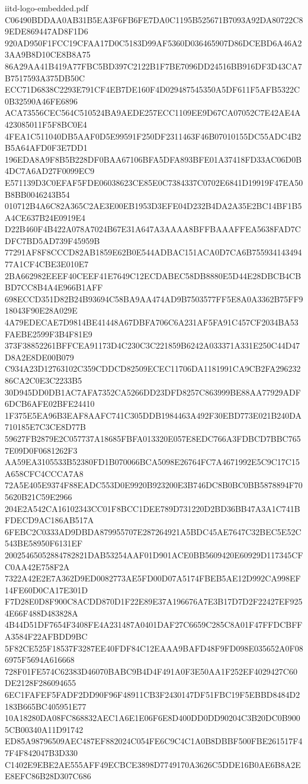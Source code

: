 \begin{filecontents*}[overwrite]{iitd-logo-embedded.pdf}
C06490BDDAA0AB31B5EA3F6FB6FE7DA0C1195B525671B7093A92DA80722C89EDE869447AD8F1D6
920AD950F1FCC19CFAA17D0C5183D99AF5360D036465907D86DCEBD6A46A23AA9B8D10CE8B8A75
86A29AA41B419A77FBC5BD397C2122B1F7BE7096DD24516BB916DF3D43CA7B7517593A375DB50C
ECC71D6838C2293E791CF4EB7DE160F4D029487545350A5DF611F5AFB5322C0B32590A46FE6896
ACA73556CEC564C510524BA9AEDE257ECC1109EE9D67CA07052C7E42AE4A423085011F5F8BC0E4
4FEA1C511040DB5AAF0D5E99591F250DF2311463F46B07010155DC55ADC4B2B5A64AFD0F3E7DD1
196EDA8A9F8B5B228DF0BAA67106BFA5DFA893BFE01A37418FD33AC06D0B4DC7A6AD27F0099EC9
E571139D3C0EFAF5FDE06038623CE85E0C7384337C0702E6841D19919F47EA50B8BB0046243B54
010712B4A6C82A365C2AE3E00EB1953D3EFE04D232B4DA2A35E2BC14BF1B5A4CE637B24E0919E4
D22B460F4B422A078A7024B67E31A647A3AAAA8BFFBAAAFFEA5638FAD7CDFC7BD5AD739F45959B
77291AF8F8CCCD82AB1859E62B0E544ADBAC151ACA0D7CA6B75593414349477A1CF4CBE3E010E7
2BA662982EEEF40CEEF41E7649C12ECDABEC58DB8880E5D44E28DBCB4CBBD7CC8B4A4E966B1AFF
698ECCD351D82B24B93694C58BA9AA474AD9B7503577FF5E8A0A3362B75FF918043F90E28A029E
4A79EDECAE7D9814BE41448A67DBFA706C6A231AF5FA91C457CF2034BA53FAEBE2599F3B4F81E9
373F38852261BFFCEA91173D4C230C3C221859B6242A033371A331E250C44D47D8A2E8DE00B079
C934A23D12763102C359CDDCD82509ECEC11706DA1181991CA9CB2FA29623286CA2C0E3C2233B5
30D945DD0DB1AC7AFA7352CA5266DD23DFD8257C863999BE88AA77929ADF6DCB6AFE02BFE24410
1F375E5EA96B3EAF8AAFC741C305DDB1984463A492F30EBD773E021B240DA710185E7C3CE8D77B
59627FB2879E2C057737A18685FBFA013320E057E8EDC766A3FDBCD7BBC7657E09D0F0681262F3
AA59EA3105533B52380FD1B070066BCA5098E26764FC7A4671992E5C9C17C15A658CFC4CCCA7A8
72A5E405E9374F88EADC553D0E9920B923200E3B746DC8B0BC0BB5878894F705620B21C59E2966
204E2A542CA16102343CC01F8BCC1DEE789D731220D2BD36BB47A3A1C741BFDECD9AC186AB517A
6FEBC2C0333AD9DBDA879955707E287264921A5BDC45AE7647C32BEC5E52C543BE58950F6131EF
20025465052884782821DAB53254AAF01D901ACE0BB5609420E60929D117345CFC0AA42E758F2A
7322A42E2E7A362D9ED0082773AE5FD00D07A5174FBEB5AE12D992CA998EF14FE60D0CA17E301D
F7D28E0D8F900C8ACDD870D1F22E89E37A196676A7E3B17D7D2F22427EF9254E66F488D483828A
4B44D51DF7654F3408FE4A231487A0401DAF27C6659C285C8A01F47FFDCBFFA3584F22AFBDD9BC
5F82CE525F18537F3287EE40FDF84C12EAAA9BAFD48F9FD098E035652A0F086975F5694A616668
728F01FE574C62383D46070BABC9B4D4F491A0F3E50AA1F252EF4029427C60DE2128F286094655
6EC1FAFEF5FADF2DD90F96F48911CB3F2430147DF51FBC19F5EBBD8484D2183B665BC405951E77
10A18280DA08FC868832AEC1A6E1E06F6E8D400DD0DD90204C3B20DC0B9005CB00340A11D91742
ED85A98796509AEC487EF882024C054FE6C9C4C1A0B8DBBF500FBE261517F47F4F842047B3D330
C1402E9EBE2AE555AFF49ECBCE3898D7749170A3626C5DDE16B0AE6B8A2EE8EFC86B28D307C686

\end{filecontents*}
